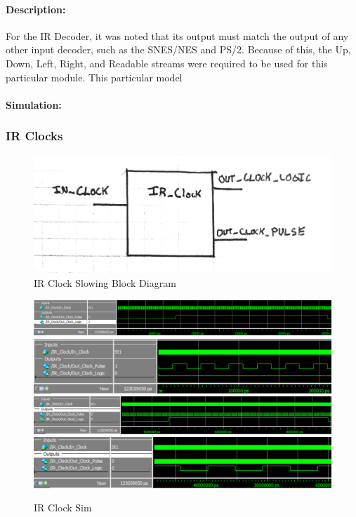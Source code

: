 \documentclass[]{article}
\begin{document}
\paragraph{Description:} For the IR Decoder, it was noted that its output must match the output of any other input decoder, such as the SNES/NES and PS/2.
Because of this, the Up, Down, Left, Right, and Readable streams were required to be used for this particular module. This particular model 
\paragraph{Simulation:} 

\subsubsection{IR Clocks}
\begin{figure}[H]\centering
    \includegraphics[width=0.9\linewidth]{figures/IR_Clock_Block.jpg}
    \caption{IR Clock Slowing Block Diagram}
    \label{fig:irClockBlock}
\end{figure}
\begin{figure}[H]\centering
    \includegraphics[width=\linewidth]{figures/IR_Clock_Sim1}
    \includegraphics[width=\linewidth]{figures/IR_Clock_Sim2}
    \includegraphics[width=\linewidth]{figures/IR_Clock_Sim3}
    \includegraphics[width=\linewidth]{figures/IR_Clock_Sim4}
    \caption{IR Clock Sim}
    \label{fig:asyncIRData}
\end{figure}
\end{document}

